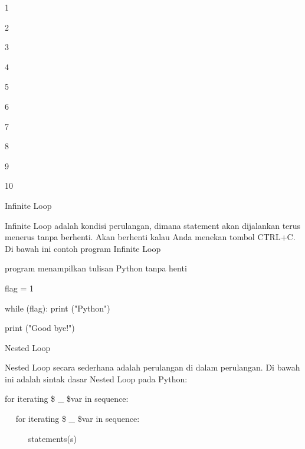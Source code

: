  \par
1 \par
2 \par
3 \par
4 \par
5 \par
6 \par
7 \par
8 \par
9 \par
10 \par
\vspace{12pt}
\vspace{\baselineskip}
\vspace{12pt}
Infinite Loop \par
\vspace{\baselineskip}
Infinite Loop adalah kondisi perulangan, dimana statement akan dijalankan terus menerus tanpa berhenti. Akan berhenti kalau Anda menekan tombol CTRL+C.\vspace{\baselineskip}
\vspace{\baselineskip}
Di bawah ini contoh program Infinite Loop\vspace{\baselineskip}
\vspace{\baselineskip}
 \par
program menampilkan tulisan Python tanpa henti \par
\vspace{12pt}
flag = 1 \par
\vspace{12pt}
while (flag): print ("Python") \par
print ("Good bye!") \par
\vspace{12pt}
\vspace{\baselineskip}
\vspace{12pt}
Nested Loop \par
\vspace{\baselineskip}
Nested Loop secara sederhana adalah perulangan di dalam perulangan.\vspace{\baselineskip}
\vspace{\baselineskip}
Di bawah ini adalah sintak dasar Nested Loop pada Python:\vspace{\baselineskip}
\vspace{\baselineskip}
 \par
for iterating \$  \_  \$var in sequence: \par
~~ for iterating \$  \_  \$var in sequence: \par
~~~~~ statements(s) \par
